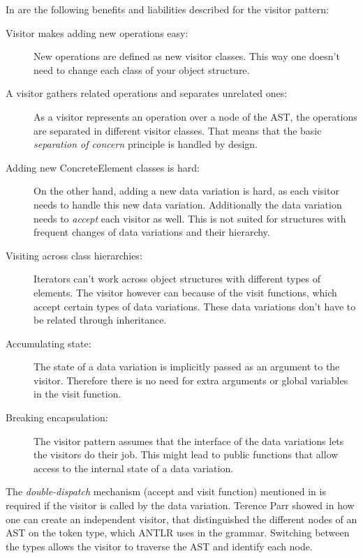 \documentclass{llncs}
\begin{document}
In \cite{GHJV94} are the following benefits and liabilities described for the visitor pattern:

\begin{description}
	\item[Visitor makes adding new operations easy:] New operations are defined as new visitor classes. This way one doesn't need to change each class of your object structure.
	
	\item[A visitor gathers related operations and separates unrelated ones:] As a visitor represents an operation over a node of the AST, the operations are separated in different visitor classes. That means that the basic \emph{separation of concern} principle is handled by design.
	
	\item[Adding new ConcreteElement classes is hard:] On the other hand, adding a new data variation is hard, as each visitor needs to handle this new data variation. Additionally the data variation needs to \emph{accept} each visitor as well. This is not suited for structures with frequent changes of data variations and their hierarchy.
	
	\item[Visiting across class hierarchies:] Iterators can't work across object structures with different types of elements. The visitor however can because of the visit functions, which accept certain types of data variations. These data variations don't have to be related through inheritance.
	
	\item[Accumulating state:] The state of a data variation is implicitly passed as an argument to the visitor. Therefore there is no need for extra arguments or global variables in the visit function.
	
	\item[Breaking encapsulation:] The visitor pattern assumes that the interface of the data variations lets the visitors do their job. This might lead to public functions that allow access to the internal state of a data variation.
\end{description}

The \emph{double-dispatch} mechanism (accept and visit function) mentioned in \cite{GHJV94} is required if the visitor is called by the data variation. Terence Parr showed in \cite{Parr09} how one can create an independent visitor, that distinguished the different nodes of an AST on the token type, which ANTLR uses in the grammar. Switching between the types allows the visitor to traverse the AST and identify each node.
\end{document}
